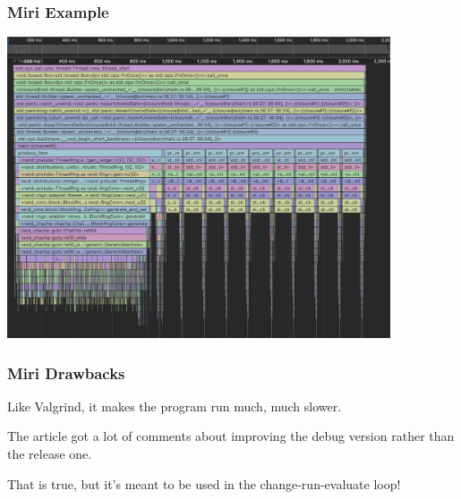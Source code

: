 \begin{frame}
\frametitle{Miri Example}

\begin{center}
	\includegraphics[width=0.85\textwidth]{images/miri-pco2.png}
\end{center}

\end{frame}

\begin{frame}
\frametitle{Miri Drawbacks}

Like Valgrind, it makes the program run much, much slower.

The article got a lot of comments about improving the debug version rather than the release one.

That is true, but it's meant to be used in the change-run-evaluate loop!

\end{frame}




